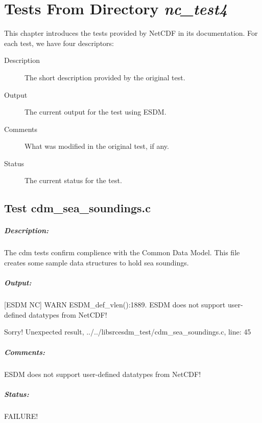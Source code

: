 \chapter{Tests From Directory {\textit{nc\_test4}}}

\tab
This chapter introduces the tests provided by NetCDF in its documentation. For each test, we have four descriptors:

\begin{description}

\item[Description] The short description provided by the original test.

\item[Output] The current output for the test using ESDM.

\item[Comments] What was modified in the original test, if any.

\item[Status] The current status for the test.

\end{description}

\section{Test cdm\_sea\_soundings.c}

\paragraph{Description:} The cdm tests confirm complience with the Common Data Model. This
file creates some sample data structures to hold sea soundings.

\paragraph{Output:} [ESDM NC] WARN ESDM\_def\_vlen():1889. ESDM does not support user-defined datatypes from NetCDF!

Sorry! Unexpected result, ../../libsrcesdm\_test/cdm\_sea\_soundings.c, line: 45

\paragraph{Comments:} ESDM does not support user-defined datatypes from NetCDF!

\paragraph{Status:} FAILURE!

